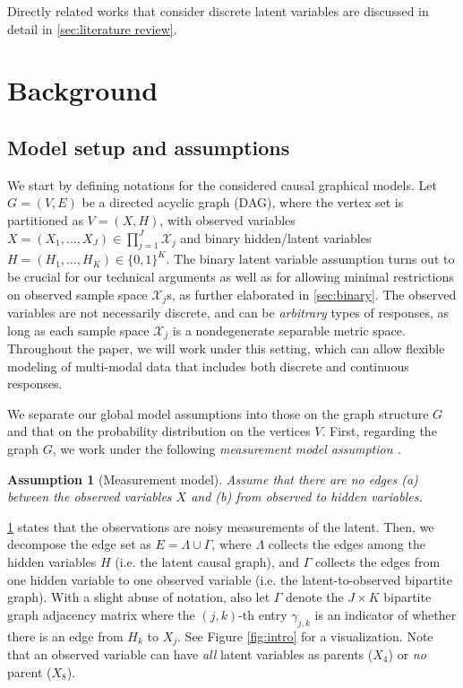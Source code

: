 \documentclass[10pt]{article} %
\newtheorem{assumption}{Assumption}
\begin{document}
%
Directly related works that consider discrete latent variables \citep{kivva2021learning, chen2024learning,chen2025identification, lee2025deep} are discussed in detail in \cref{sec:literature review}.


%


\section{Background}\label{sec:setup}
\subsection{Model setup and assumptions}
We start by defining notations for the considered causal graphical models.
Let $G = (V, E)$ be a directed acyclic graph (DAG), where the vertex set is partitioned as $V = (X, H)$, with observed variables $X = (X_1, \ldots, X_J) \in \prod_{j=1}^J \mathcal{X}_j$ and binary hidden/latent variables $H = (H_1, \ldots, H_K) \in \{0,1\}^K$. {The binary latent variable assumption turns out to be crucial for our technical arguments as well as for allowing minimal restrictions on observed sample space $\mathcal{X}_j$s, as further elaborated in \cref{sec:binary}.}
%
%
The observed variables are not necessarily discrete, and can be \emph{arbitrary} types of responses, as long as each sample space $\mathcal{X}_j$ is a nondegenerate separable metric space. Throughout the paper, we will work under this setting, which can allow flexible modeling of multi-modal data that includes both discrete and continuous responses. %

We separate our global model assumptions into those on the graph structure $G$ and that on the probability distribution on the vertices $V$. First, regarding the graph $G$, we work under the following \emph{measurement model assumption \citep{silva2004generalized, silva2006learning, kivva2021learning}.}
%
\begin{assumption}[Measurement model]\label{assmp:measurement model}
    Assume that there are no edges (a) between the observed variables $X$ and (b) from observed to hidden variables.
\end{assumption}
\cref{assmp:measurement model} states that the observations are noisy measurements of the latent. Then, we decompose the edge set as $E = \Lambda \cup \Gamma$, where $\Lambda$ collects the edges among the hidden variables $H$ (i.e. the latent causal graph), and $\Gamma$ collects the edges from one hidden variable to one observed variable (i.e. the latent-to-observed bipartite graph). With a slight abuse of notation, also let $\Gamma$ denote the $J \times K$ bipartite graph adjacency matrix where the $(j,k)$-th entry $\gamma_{j,k}$ is an indicator of whether there is an edge from $H_k$ to $X_j$.
See Figure \ref{fig:intro} for a visualization. Note that an observed variable can have \emph{all} latent variables as parents ($X_4$) or \emph{no} parent ($X_{8}$).
%
%
%
%
\end{document}
